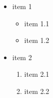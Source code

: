 \begin{itemize}
	\item item 1
	\begin{itemize}
		\item item 1.1
		\item item 1.2
	\end{itemize}
	\item item 2
	\begin{enumerate}
		\item item 2.1
		\item item 2.2
	\end{enumerate}
\end{itemize}
